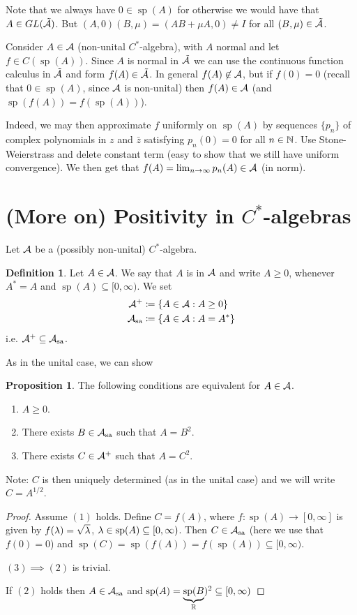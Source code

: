 \documentclass[10pt,english,a4paper]{article}
\theoremstyle{definition}
\newtheorem*{definition}{Definition}
\newtheorem*{proposition}{Proposition}
\let\emph\relax %
\def\Assa{\As_{\text{sa}}}
\DeclareMathOperator{\Sp}{sp}
\begin{document}
Note that we always have $0 \in \Sp(A)$ for otherwise we would have that 
$A \in GL(\tilde{\mathcal{A}})$. But $(A,0)(B,\mu) = (AB +\mu A,0) \neq I$ for all
$(B,\mu) \in \tilde{\mathcal{A}}$.




Consider $A \in \mathcal{A}$ (non-unital $C^*$-algebra), with $A$ normal and let 
$f \in C(\Sp(A))$. 
Since $A$ is normal in $\tilde{\mathcal{A}}$ we can use the continuous function
calculus in $\tilde{\mathcal{A}}$ and form $f(A) \in \tilde{\mathcal{A}}$. In general 
$f(A) \not\in \mathcal{A}$, but if $f(0)=0$ (recall that $0 \in \Sp(A)$, since $\mathcal{A}$ is
non-unital) then $f(A) \in \mathcal{A}$  (and $\Sp(f(A)) = f(\Sp(A))$).

Indeed, we may then approximate $f$ uniformly on $\Sp(A)$ by sequences 
$\{p_n\}$ of complex polynomials in $z$ and $\bar{z}$ satisfying $p_n(0) =0$
for all $n \in \mathbb{N}$.
Use Stone-Weierstrass and delete constant term (easy to show that we still have
uniform convergence). We then get that $f(A) = \lim_{n\to\infty} p_n(A) \in
\mathcal{A}$ (in norm).

\section{(More on) Positivity in $C^*$-algebras}
Let $\mathcal{A}$ be a (possibly non-unital) $C^*$-algebra.
\begin{definition}
    Let $A \in \mathcal{A}$. We say that $A$ is \emph{positive} in $\mathcal{A}$ and 
    write $A \geq 0$, whenever $A^*=A$ and $\Sp(A) \subseteq [0,\infty)$.
    We set 
    \begin{align*}
        \As^+ &\coloneqq \{ A \in \As : A \geq 0 \} \\
        \Assa &\coloneqq \{ A \in \As : A = A^* \}
    \end{align*}
i.e. $\As^+ \subseteq \Assa$.
\end{definition}

As in the unital case, we can show 
\begin{proposition}
    The following conditions are equivalent for $A \in \mathcal{A}$.
\begin{enumerate}[(1)]
    \item $A \geq 0$. 
    \item There exists $B \in \Assa$ such that $A = B^2$.
    \item There exists $C \in \mathcal{A}^+$ such that $A = C^2$.
\end{enumerate}
Note: $C$ is then uniquely determined (as in the unital case) and we will
write $C = A^{1/2}$.
\end{proposition}
\begin{proof}Assume $(1)$ holds.
    Define $C = f(A)$, where $f \colon \Sp(A) \to[0,\infty]$ is given by 
    $f(\lambda) = \sqrt{\lambda}$, $\la \in \Sp(A) \subseteq [0,\infty)$.
    Then $C \in \Assa$ (here we use that $f(0)=0$) and 
    $\Sp(C) = \Sp(f(A)) = f(\Sp(A)) \subseteq [0,\infty)$. 

    $(3)\implies(2)$ is trivial.

    If $(2)$ holds then $A \in \Assa$ and $\Sp(A) = \ub{\Sp(B}_{\R})^{2} \subseteq [0,\infty)$
\end{proof}
\end{document}

